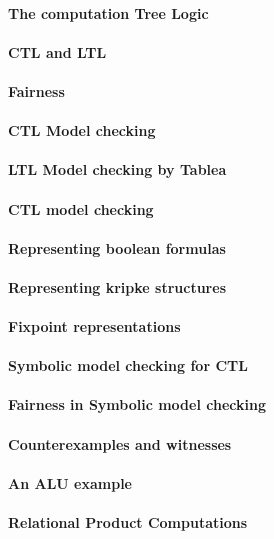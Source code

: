 \paragraph{The computation Tree Logic}
\paragraph{CTL and LTL}
\paragraph{Fairness}
\paragraph{CTL Model checking}
\paragraph{LTL Model checking by Tablea}
\paragraph{CTL model checking}
\paragraph{Representing boolean formulas}
\paragraph{Representing kripke structures}
\paragraph{Fixpoint representations}
\paragraph{Symbolic model checking for CTL}
\paragraph{Fairness in Symbolic model checking}
\paragraph{Counterexamples and witnesses}
\paragraph{An ALU example}
\paragraph{Relational Product Computations}
